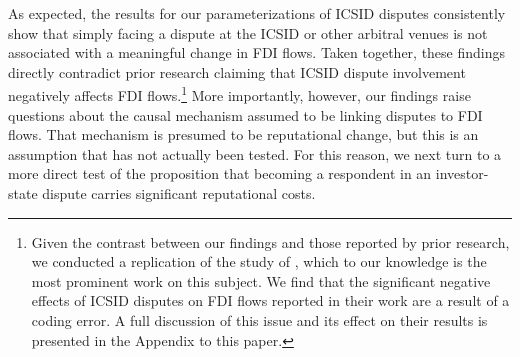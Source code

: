 \documentclass[12pt,onesided]{amsart}
\begin{document}

As expected, the results for our parameterizations of ICSID disputes consistently show that simply facing a dispute at the ICSID or other arbitral venues is not associated with a meaningful change in FDI flows. Taken together, these findings directly contradict prior research claiming that ICSID dispute involvement negatively affects FDI flows.\footnote{Given the contrast between our findings and those reported by prior research, we conducted a replication of the study of \citet{allee:peinhardt:2011}, which to our knowledge is the most prominent work on this subject. We find that the significant negative effects of ICSID disputes on FDI flows reported in their work are a result of a coding error. A full discussion of this issue and its effect on their results is presented in the Appendix to this paper.} More importantly, however, our findings raise questions about the causal mechanism assumed to be linking disputes to FDI flows. That mechanism is presumed to be reputational change, but this is an assumption that has not actually been tested. For this reason, we next turn to a more direct test of the proposition that becoming a respondent in an investor-state dispute carries significant reputational costs.
\end{document}
